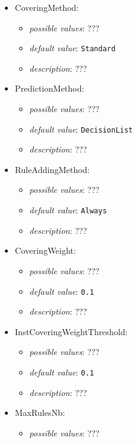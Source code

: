\documentclass{article}
\begin{document}
\begin{itemize}
    \item CoveringMethod:
           \begin{itemize}
                \item \emph{possible values}: ???
                \item \emph{default value}: \texttt{Standard}
                \item \emph{description}: ???
           \end{itemize}
    \item PredictionMethod:
           \begin{itemize}
                \item \emph{possible values}: ???
                \item \emph{default value}: \texttt{DecisionList}
                \item \emph{description}: ???
           \end{itemize}
    \item RuleAddingMethod:
           \begin{itemize}
                \item \emph{possible values}: ???
                \item \emph{default value}: \texttt{Always}
                \item \emph{description}: ???
           \end{itemize}
    \item CoveringWeight:
           \begin{itemize}
                \item \emph{possible values}: ???
                \item \emph{default value}: \texttt{0.1}
                \item \emph{description}: ???
           \end{itemize}
    \item InstCoveringWeightThreshold:
           \begin{itemize}
                \item \emph{possible values}: ???
                \item \emph{default value}: \texttt{0.1}
                \item \emph{description}: ???
           \end{itemize}
    \item MaxRulesNb:
           \begin{itemize}
                \item \emph{possible values}: ???

\end{itemize}
\end{itemize}
\end{document}
